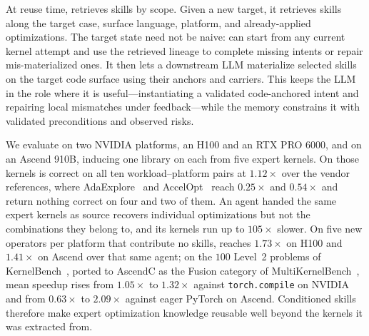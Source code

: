 
At reuse time, \sys retrieves skills by scope. 
Given a new target, it retrieves skills along the target case, surface language, platform, and already-applied optimizations. The target state need not be naive: \sys can start from any current kernel attempt and use the retrieved lineage to complete missing intents or repair mis-materialized ones. It then lets a downstream LLM materialize selected skills on the target code surface using their anchors and carriers.
This keeps the LLM in the role where it is useful---instantiating a validated code-anchored intent and repairing local mismatches under feedback---while the memory constrains it with validated preconditions and observed risks.

We evaluate \sys{} on two NVIDIA platforms, an H100 and an RTX PRO 6000, and on an Ascend 910B, inducing one library on each from five expert kernels. On those kernels \sys{} is correct on all ten workload--platform pairs at $1.12\times$ over the vendor references, where AdaExplore~\citep{adaexplore} and AccelOpt~\citep{accelopt} reach $0.25\times$ and $0.54\times$ and return nothing correct on four and two of them. An agent handed the same expert kernels as source recovers individual optimizations but not the combinations they belong to, and its kernels run up to $105\times$ slower. On five new operators per platform that contribute no skills, \sys{} reaches $1.73\times$ on H100 and $1.41\times$ on Ascend over that same agent; on the $100$ Level~2 problems of KernelBench~\citep{kernelbench}, ported to AscendC as the Fusion category of MultiKernelBench~\citep{multikernelbench}, mean speedup rises from $1.05\times$ to $1.32\times$ against \texttt{torch.compile} on NVIDIA and from $0.63\times$ to $2.09\times$ against eager PyTorch on Ascend. Conditioned skills therefore make expert optimization knowledge reusable well beyond the kernels it was extracted from.

